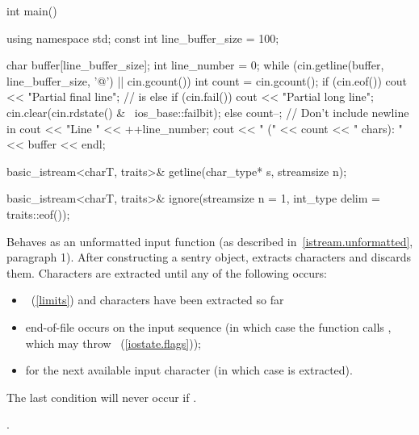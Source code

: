 \begin{itemdescr}
\begin{example}
\begin{codeblock}
int main() {
  using namespace std;
  const int line_buffer_size = 100;

  char buffer[line_buffer_size];
  int line_number = 0;
  while (cin.getline(buffer, line_buffer_size, '@\textbackslash@n') || cin.gcount()) {
    int count = cin.gcount();
    if (cin.eof())
      cout << "Partial final line";   //  is 
    else if (cin.fail()) {
      cout << "Partial long line";
      cin.clear(cin.rdstate() & ~ios_base::failbit);
    } else {
      count--;                        // Don't include newline in 
      cout << "Line " << ++line_number;
    }
    cout << " (" << count << " chars): " << buffer << endl;
  }
}
\end{codeblock}
\end{example}
\end{itemdescr}

%
\begin{itemdecl}
basic_istream<charT, traits>& getline(char_type* s, streamsize n);
\end{itemdecl}

\begin{itemdescr}
\pnum
\returns
{}
\end{itemdescr}

%
\begin{itemdecl}
basic_istream<charT, traits>&
    ignore(streamsize n = 1, int_type delim = traits::eof());
\end{itemdecl}

\begin{itemdescr}
\pnum
\effects
Behaves as an unformatted input function
(as described in~\ref{istream.unformatted}, paragraph 1).
After constructing a sentry object, extracts
characters and discards them.
Characters are extracted until any of the following occurs:
\begin{itemize}
\item
{}~(\ref{limits})
and
 characters have been extracted so far
\item
end-of-file occurs on the input sequence
(in which case the function calls
,
which may throw
~(\ref{iostate.flags}));
\item
{}
for the next available input character 
(in which case  is extracted).
\end{itemize}

\pnum
\remarks
The last condition will never occur if
.

\pnum
\returns
{}.
\end{itemdescr}

